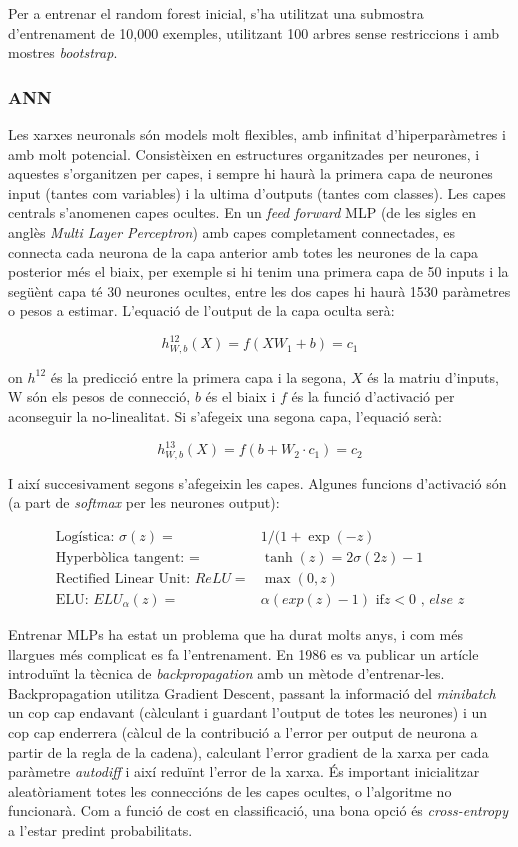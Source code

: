 \documentclass[12pt, spanish]{article}
\begin{document}
Per a entrenar el random forest inicial, s'ha utilitzat una submostra d'entrenament de 10,000 exemples, utilitzant 100 arbres sense restriccions i amb mostres \textit{bootstrap}. 

\subsubsection{ANN}

Les xarxes neuronals són models molt flexibles, amb infinitat d'hiperparàmetres i amb molt potencial. Consistèixen en estructures organitzades per neurones, i aquestes s'organitzen per capes, i sempre hi haurà la primera capa de neurones input (tantes com variables) i la ultima d'outputs (tantes com classes). Les capes centrals s'anomenen capes ocultes. En un \textit{feed forward} MLP (de les sigles en anglès \textit{Multi Layer Perceptron}) amb capes completament connectades, es connecta cada neurona de la capa anterior amb totes les neurones de la capa posterior més el biaix, per exemple si hi tenim una primera capa de 50 inputs i la següènt capa té 30 neurones ocultes, entre les dos capes hi haurà 1530 paràmetres o pesos  a estimar. L'equació de l'output de la capa oculta serà:

$$
h^{12}_{W,b}(X) = f(XW_1 + b) = c_1
$$

on $h^{12}$ és la predicció entre la primera capa i la segona, $X$ és la matriu d'inputs, W són els pesos de connecció, $b$ és el biaix i $f$ és la funció d'activació per aconseguir la no-linealitat. Si s'afegeix una segona capa, l'equació serà:

$$
h^{13}_{W,b}(X) = f(b + W_2 \cdot c_1) = c_2
$$

I així succesivament segons s'afegeixin les capes. Algunes funcions d'activació són (a part de \textit{softmax} per les neurones output):
 
\begin{align*}
\text{Logística: }  \sigma(z) = & 1 / (1 + \exp(-z) \\
\text{Hyperbòlica tangent: } = & \tanh(z) = 2\sigma(2z) - 1\\
\text{Rectified Linear Unit: } ReLU = & \max(0, z) \\
\text{ELU: }  ELU_\alpha(z) = & \alpha(exp(z) - 1) \text{ if} z < 0\textit{ , else }z
\end{align*}

Entrenar MLPs ha estat un problema que ha durat molts anys, i com més llargues més complicat es fa l'entrenament. En 1986 es va publicar un artícle \cite{rumelhart1985learning} introduïnt la tècnica de \textit{backpropagation} amb un mètode d'entrenar-les. Backpropagation utilitza Gradient Descent, passant la informació del \textit{minibatch} un cop cap endavant (càlculant i guardant l'output de totes les neurones) i un cop cap enderrera (càlcul de la contribució a l'error per output de neurona a partir de la regla de la cadena),  calculant l'error gradient de la xarxa per cada paràmetre \textit{autodiff} i així reduïnt l'error de la xarxa. És important inicialitzar aleatòriament totes les conneccións de les capes ocultes, o l'algoritme no funcionarà. Com a funció de cost en classificació, una bona opció és \textit{cross-entropy} a l'estar predint probabilitats.
\end{document}
